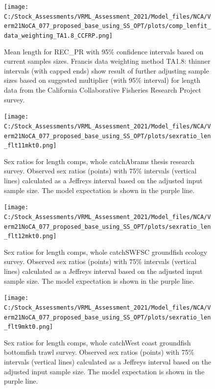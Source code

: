 \documentclass[11pt,
  english,
  a4paper,
]{article}
\begin{document}
\begin{figure}
\centering
\texttt{[image: C:/Stock\_Assessments/VRML\_Assessment\_2021/Model\_files/NCA/Verm21NoCA\_077\_proposed\_base\_using\_SS\_OPT/plots/comp\_lenfit\_data\_weighting\_TA1.8\_CCFRP.png]}
\caption{Mean length for REC\_PR with 95\% confidence intervals based on current samples sizes. Francis data weighting method TA1.8: thinner intervals (with capped ends) show result of further adjusting sample sizes based on suggested multiplier (with 95\% interval) for length data from the California Collaborative Fisheries Research Project survey.\label{fig:mean-len-fit-CCFRP}}
\end{figure}

\begin{figure}
\centering
\texttt{[image: C:/Stock\_Assessments/VRML\_Assessment\_2021/Model\_files/NCA/Verm21NoCA\_077\_proposed\_base\_using\_SS\_OPT/plots/sexratio\_len\_flt11mkt0.png]}
\caption{Sex ratios for length comps, whole catchAbrams thesis research survey. Observed sex ratios (points) with 75\% intervals (vertical lines) calculated as a Jeffreys interval based on the adjusted input sample size. The model expectation is shown in the purple line.\label{fig:sexratio-ABRAMS-RESEARCH}}
\end{figure}

\begin{figure}
\centering
\texttt{[image: C:/Stock\_Assessments/VRML\_Assessment\_2021/Model\_files/NCA/Verm21NoCA\_077\_proposed\_base\_using\_SS\_OPT/plots/sexratio\_len\_flt12mkt0.png]}
\caption{Sex ratios for length comps, whole catchSWFSC groundfish ecology survey. Observed sex ratios (points) with 75\% intervals (vertical lines) calculated as a Jeffreys interval based on the adjusted input sample size. The model expectation is shown in the purple line.\label{fig:sexratio-SWFSC-GF-ECOL}}
\end{figure}

\begin{figure}
\centering
\texttt{[image: C:/Stock\_Assessments/VRML\_Assessment\_2021/Model\_files/NCA/Verm21NoCA\_077\_proposed\_base\_using\_SS\_OPT/plots/sexratio\_len\_flt9mkt0.png]}
\caption{Sex ratios for length comps, whole catchWest coast groundfish bottomfish trawl survey. Observed sex ratios (points) with 75\% intervals (vertical lines) calculated as a Jeffreys interval based on the adjusted input sample size. The model expectation is shown in the purple line.\label{fig:sexratio-NWFSC-TWL}}
\end{figure}
\end{document}
